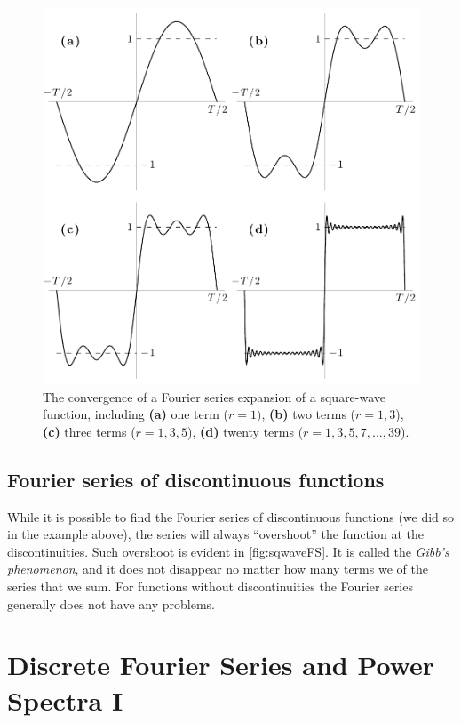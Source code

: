 \documentclass[11pt,twoside,a4paper]{article}
\begin{document}
\begin{figure}[tb]
  \centering
  \includegraphics[width=4.5in]{../figs/L14/FourierSeriesConvergence}
  \caption{The convergence of a Fourier series expansion of a
    square-wave function, including \textbf{(a)} one term ($r=1)$,
    \textbf{(b)} two terms ($r=1,3$), \textbf{(c)} three terms
    ($r=1,3,5$), \textbf{(d)} twenty terms ($r=1,3,5,7,...,39$).}
  \label{fig:sqwaveFS}
\end{figure}

\subsection{Fourier series of discontinuous functions}

While it is possible to find the Fourier series of discontinuous
functions (we did so in the example above), the series will always
``overshoot'' the function at the discontinuities.  Such overshoot is
evident in \autoref{fig:sqwaveFS}.  It is called the \textit{Gibb's
  phenomenon}, and it does not disappear no matter how many terms we
of the series that we sum. For functions without discontinuities the
Fourier series generally does not have any problems.


\section{Discrete Fourier Series and Power Spectra I}
\label{sec:dft1}
\end{document}
